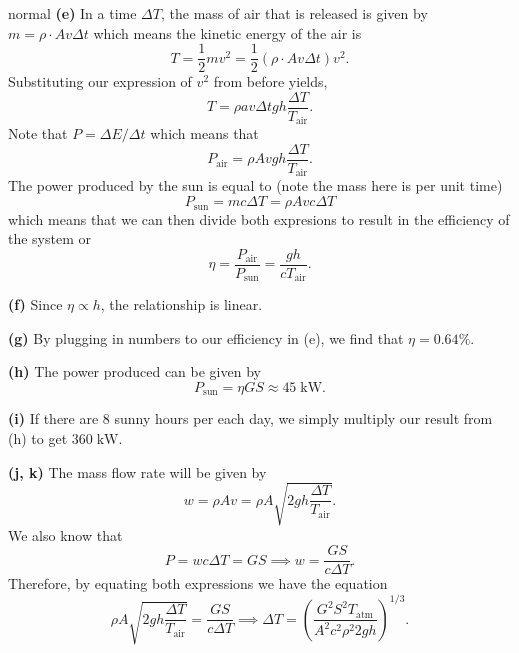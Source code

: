 \begin{solution}{normal}
\noindent \textbf{(e)} In a time $\Delta T$, the mass of air that is released is given by $m = \rho\cdot Av\Delta t$ which means the kinetic energy of the air is 
\[ T= \frac{1}{2}mv^2 = \frac{1}{2}(\rho\cdot Av\Delta t)v^2.\] 
Substituting our expression of $v^2$ from before yields, 
\[T = \rho av\Delta t gh\frac{\Delta T}{T_{\text{air}}}.\]
Note that $P = \Delta E/\Delta t$ which means that 
\[P_{\text{air}} = \rho A v gh \frac{\Delta T}{T_{\text{air}}}.\]
The power produced by the sun is equal to (note the mass here is per unit time) 
\[P_{\text{sun}} = mc \Delta T = \rho Avc \Delta T\]
which means that we can then divide both expresions to result in the efficiency of the system or 
\[\eta = \frac{P_{\text{air}}}{P_{\text{sun}}} = \frac{gh}{cT_{\text{air}}}.\]
\vspace{3mm}

\noindent \textbf{(f)} Since $\eta \propto h$, the relationship is linear. 
\vspace{3mm}

\noindent \textbf{(g)} By plugging in numbers to our efficiency in (e), we find that $\eta = 0.64\%$.
\vspace{3mm}

\noindent \textbf{(h)} The power produced can be given by 
\[P_{\text{sun}} = \eta GS \approx 45\;\mathrm{kW}.\]
\vspace{3mm}

\noindent \textbf{(i)} If there are 8 sunny hours per each day, we simply multiply our result from (h) to get $360\;\mathrm{kW}$.

\noindent \textbf{(j, k)} The mass flow rate will be given by 
\[w = \rho Av = \rho A\sqrt{2gh \frac{\Delta T}{T_{\text{air}}}}.\]
We also know that 
\[P = wc\Delta T = GS\implies w = \frac{GS}{c\Delta T}.\]
Therefore, by equating both expressions we have the equation 
\[\rho A\sqrt{2gh \frac{\Delta T}{T_{\text{air}}}} = \frac{GS}{c\Delta T}\implies \Delta T = \left(\frac{G^2 S^2 T_{\text{atm}}}{A^2 c^2\rho^2 2gh}\right)^{1/3}.\]
\end{solution}